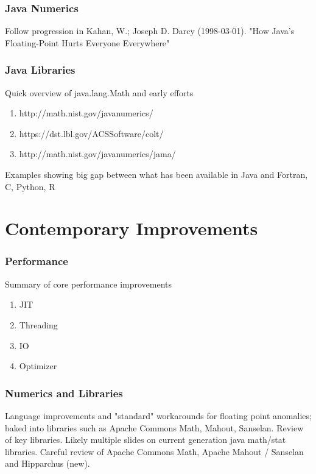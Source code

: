 \documentclass[14pt,mathserif]{beamer}
\begin{document}
\begin{frame}
  \frametitle{Java Numerics}
Follow progression in
Kahan, W.; Joseph D. Darcy (1998-03-01). "How Java's Floating-Point Hurts Everyone Everywhere"

\end{frame}

\begin{frame}
  \frametitle{Java Libraries}
Quick overview of java.lang.Math and early efforts 
\begin{enumerate}
\item http://math.nist.gov/javanumerics/
\item https://dst.lbl.gov/ACSSoftware/colt/
\item http://math.nist.gov/javanumerics/jama/
\end{enumerate}
Examples showing big gap between what has been available in Java and Fortran, C, Python, R
\end{frame}

\section[History]{Contemporary Improvements}

\begin{frame}
  \frametitle{Performance}
  Summary of core performance improvements
  \begin{enumerate}
  \item JIT
  \item Threading
  \item IO
  \item Optimizer
  \end{enumerate}
\end{frame}

\begin{frame}
  \frametitle{Numerics and Libraries}
  Language improvements and "standard" workarounds for floating point anomalies; baked 
  into libraries such as Apache Commons Math, Mahout, Sanselan.  Review of key libraries.
  Likely multiple slides on current generation java math/stat libraries.  Careful review of Apache Commons Math, Apache Mahout / Sanselan and Hipparchus (new).
\end{frame}
\end{document}
